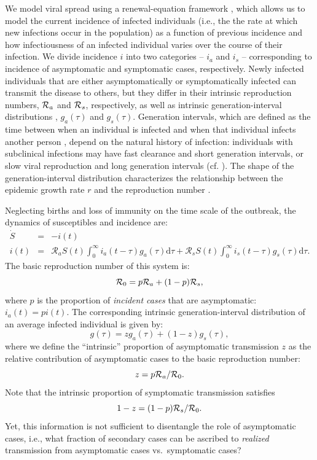 We model viral spread using a renewal-equation framework \citep{heesterbeek1996concept}, which allows us to model the current incidence of infected individuals (i.e., the the rate at which new infections occur in the population) as a function of previous incidence and how infectiousness of an infected individual varies over the course of their infection.
We divide incidence $i$ into two categories -- $i_a$ and $i_s$ -- corresponding to incidence of asymptomatic and symptomatic cases, respectively.
Newly infected individuals that are either asymptomatically or symptomatically infected can transmit the disease to others, but they differ in their intrinsic reproduction numbers, ${\cal{R}}_a$ and ${\cal{R}}_s$, respectively, as well as intrinsic generation-interval distributions \citep{champredon2015intrinsic}, $g_a(\tau)$ and $g_s(\tau)$.
Generation intervals, which are defined as the time between when an individual is infected and when that individual infects another person \citep{svensson2007note}, depend on the natural history of infection:
individuals with subclinical infections may have fast clearance and short generation intervals, or slow viral reproduction and long generation intervals (cf. \citep{roberts2007model}).
The shape of the generation-interval distribution characterizes the relationship between the epidemic growth rate $r$ and the reproduction number \citep{wallinga2007generation}.

Neglecting births and loss of immunity on the time scale of the outbreak, the dynamics of susceptibles and incidence are:
\begin{eqnarray}
\dot{S}&=&-i(t) \\
i(t)&=&\mathcal R_a S(t) \int_0^\infty i_a(t-\tau) g_a(\tau) \mathrm{d}\tau + \mathcal R_s S(t) \int_0^\infty i_s(t-\tau) g_s(\tau) \mathrm{d}\tau.
\end{eqnarray}
The basic reproduction number of this system is:
\begin{equation}
{\cal{R}}_{0}= p {\cal{R}}_a + (1-p) {\cal{R}}_s,
\end{equation}
where $p$ is the proportion of \emph{incident cases} that are asymptomatic: $i_a(t) = p i(t)$.
The corresponding intrinsic generation-interval distribution of an average infected individual is given by: 
\begin{equation}
g(\tau) = z g_a(\tau) + (1-z) g_s(\tau),
\end{equation}
where we define the ``intrinsic'' proportion of asymptomatic transmission $z$ as the relative contribution of asymptomatic cases to the basic reproduction number:
\begin{equation}
z = p {\cal{R}}_a/{\cal{R}}_{0}.
\end{equation}
Note that the intrinsic proportion of symptomatic transmission satisfies
\begin{equation}
1-z = (1-p) {\cal{R}}_s/{\cal{R}}_{0}.
\end{equation}
Yet, this information is not sufficient to disentangle the role of asymptomatic cases, i.e., what fraction of secondary cases can be ascribed to \emph{realized} transmission from asymptomatic cases vs.~symptomatic cases?

